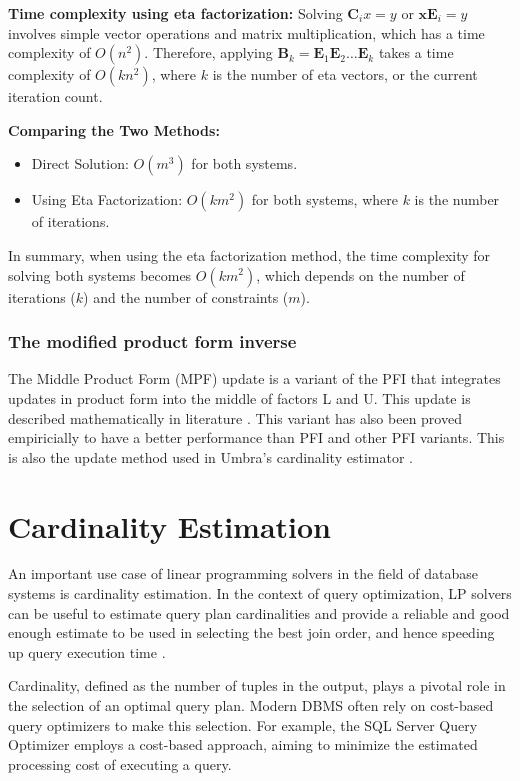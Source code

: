 \textbf{Time complexity using eta factorization:}
Solving \(\mathbf{C}_i x = y\) or  \(\mathbf{x}\mathbf{E}_i = y\) involves
simple vector operations and matrix multiplication,
which has a time complexity of \(O(n^2)\).
Therefore, applying \( \mathbf{B}_k = \mathbf{E}_1 \mathbf{E}_2 \ldots \mathbf{E}_k\)
takes a time complexity of \(O(kn^2)\), where $k$ is the number of eta vectors,
or the current iteration count.

\textbf{Comparing the Two Methods:}
\begin{itemize}
    \item Direct Solution: \(O(m^3)\) for both systems.
    \item Using Eta Factorization: \(O(km^2)\) for both systems,
          where \(k\) is the number of iterations.
\end{itemize}

In summary, when using the eta factorization method,
the time complexity for solving both systems becomes \(O(km^2)\),
which depends on the number of iterations (\(k\)) and the number of
constraints (\(m\)).

\subsubsection{The modified product form inverse}
The Middle Product Form (MPF) update is a variant of the PFI that integrates
updates in product form into the middle of factors L and U.
This update
is described mathematically in literature \parencite{huangfu2015novel}. This variant
has also been proved empiricially to have a better performance than PFI and other PFI variants.
This is also the update method used in Umbra's cardinality estimator \parencite{Umbra}.

\section{Cardinality Estimation}\label{section:cardinality-estimate}
An important use case of linear programming solvers in the field of database systems is
cardinality estimation.
In the context of query optimization, LP solvers can be useful to estimate query plan
cardinalities and provide a reliable and good enough estimate to be used in selecting
the best join order, and hence speeding up query execution time \parencite{leis2018query}.

Cardinality, defined as the number of tuples in the output,
plays a pivotal role in the selection of an optimal query plan.
Modern DBMS often rely on
cost-based query optimizers to make this selection.
For example, the SQL Server Query Optimizer
\parencite{microsoft2023cardinality} employs a
cost-based approach, aiming to minimize the estimated
processing cost of executing a query.

